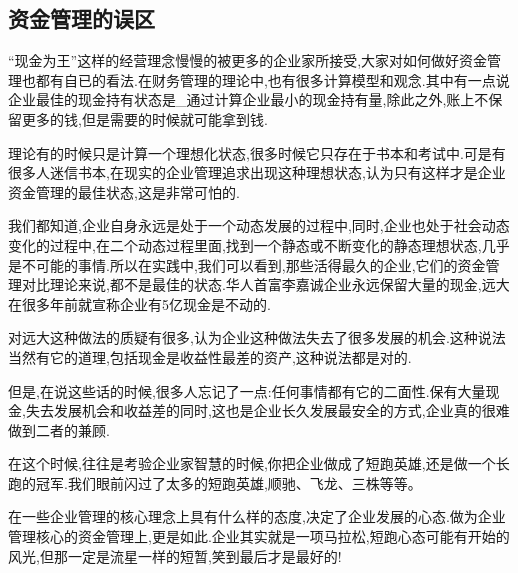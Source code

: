 \subsection {资金管理的误区}

    “现金为王”这样的经营理念慢慢的被更多的企业家所接受,大家对如何做好资金管理也都有自已的看法.在财务管理的理论中,也有很多计算模型和观念.其中有一点说企业最佳的现金持有状态是_通过计算企业最小的现金持有量,除此之外,账上不保留更多的钱,但是需要的时候就可能拿到钱.

    理论有的时候只是计算一个理想化状态,很多时候它只存在于书本和考试中.可是有很多人迷信书本,在现实的企业管理追求出现这种理想状态,认为只有这样才是企业资金管理的最佳状态,这是非常可怕的.

    我们都知道,企业自身永远是处于一个动态发展的过程中,同时,企业也处于社会动态变化的过程中,在二个动态过程里面,找到一个静态或不断变化的静态理想状态,几乎是不可能的事情.所以在实践中,我们可以看到,那些活得最久的企业,它们的资金管理对比理论来说,都不是最佳的状态.华人首富李嘉诚企业永远保留大量的现金,远大在很多年前就宣称企业有5亿现金是不动的.

    对远大这种做法的质疑有很多,认为企业这种做法失去了很多发展的机会.这种说法当然有它的道理,包括现金是收益性最差的资产,这种说法都是对的.

    但是,在说这些话的时候,很多人忘记了一点:任何事情都有它的二面性.保有大量现金,失去发展机会和收益差的同时,这也是企业长久发展最安全的方式,企业真的很难做到二者的兼顾.

    在这个时候,往往是考验企业家智慧的时候,你把企业做成了短跑英雄,还是做一个长跑的冠军.我们眼前闪过了太多的短跑英雄,顺驰、飞龙、三株等等。

    在一些企业管理的核心理念上具有什么样的态度,决定了企业发展的心态.做为企业管理核心的资金管理上,更是如此.企业其实就是一项马拉松,短跑心态可能有开始的风光,但那一定是流星一样的短暂,笑到最后才是最好的!
